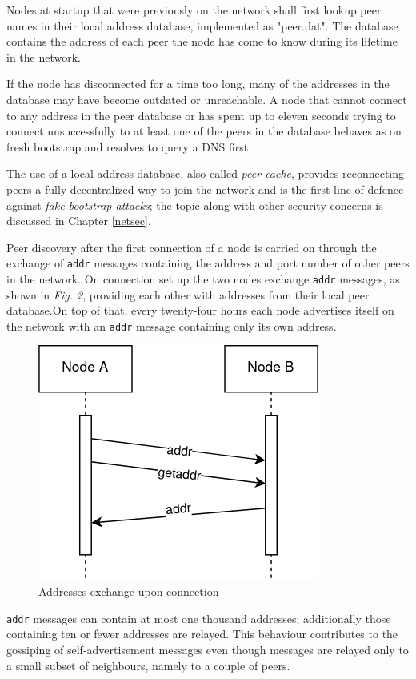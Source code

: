 \documentclass[12pt, letterpaper, twoside]{article}
\begin{document}
Nodes at startup that were previously on the network shall first lookup peer names in their local address database, implemented as "peer.dat". The database contains the address of each peer the node has come to know during its lifetime in the network.

If the node has disconnected for a time too long, many of the addresses in the database may have become outdated or unreachable. A node that cannot connect to any address in the peer database or has spent up to eleven seconds trying to connect unsuccessfully to at least one of the peers in the database behaves as on fresh bootstrap and resolves to query a DNS first.

The use of a local address database, also called \emph{peer cache}, provides reconnecting peers a fully-decentralized way to join the network and is the first line of defence against \emph{fake bootstrap attacks}; the topic along with other security concerns is discussed in Chapter \ref{netsec}.

Peer discovery after the first connection of a node is carried on through the exchange of \texttt{addr} messages containing the address and port number of other peers in the network. On connection set up the two nodes exchange \texttt{addr} messages, as shown in \emph{Fig. 2}, providing each other with addresses from their local peer database.On top of that, every twenty-four hours each node advertises itself on the network with an \texttt{addr} message containing only its own address.

\begin{figure}[h]
	\includegraphics[width=.45\textwidth]{pict/BTCaddr.png}
	\centering
	\caption{Addresses exchange upon connection}
\end{figure}

 \texttt{addr} messages can contain at most one thousand addresses; additionally those containing ten or fewer addresses are relayed. This behaviour contributes to the gossiping of self-advertisement messages even though messages are relayed only to a small subset of neighbours, namely to a couple of peers.
\end{document}
